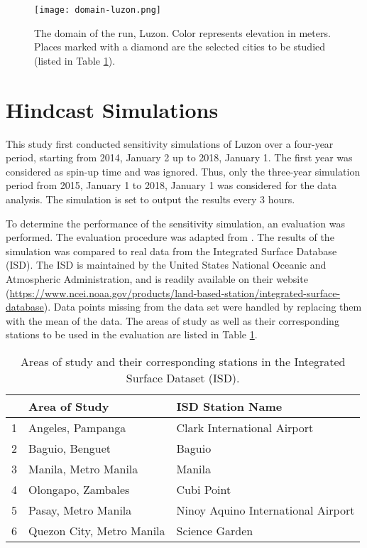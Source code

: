 		\begin{figure}
			\centering
			\texttt{[image: domain-luzon.png]}
			\caption{
				The domain of the run, Luzon.
				Color represents elevation in meters.
				Places marked with a diamond are the selected cities to be studied (listed in Table \ref{tab:isd-stations}).
			}
			\label{fig:domain-luzon}
		\end{figure}	
		
	
\section{Hindcast Simulations}
	This study first conducted sensitivity simulations of Luzon over a four-year period, starting from 2014, January 2 up to 2018, January 1.
	The first year was considered as spin-up time and was ignored.
	Thus, only the three-year simulation period from 2015, January 1 to 2018, January 1 was considered for the data analysis.
	The simulation is set to output the results every 3 hours.
	
	To determine the performance of the sensitivity simulation, an evaluation was performed. The evaluation procedure was adapted from \textcite{Bilang2022}.
	The results of the simulation was compared to real data from the Integrated Surface Database (ISD).
	The ISD is maintained by the United States National Oceanic and Atmospheric Administration, and is readily available on their website 
		(\url{https://www.ncei.noaa.gov/products/land-based-station/integrated-surface-database}).
	Data points missing from the data set were handled by replacing them with the mean of the data.
	The areas of study as well as their corresponding stations to be used in the evaluation are listed in Table \ref{tab:isd-stations}.

	\begin{table}	
		\caption{Areas of study and their corresponding stations in the Integrated Surface Dataset (ISD).}
		\label{tab:isd-stations}
		\centering
		\begin{tabular}{lll}
			\hline \hline
			& Area of Study             & ISD Station Name                       \\
			\hline
			1 & Angeles, Pampanga         & Clark International Airport        \\
			2 & Baguio, Benguet           & Baguio                             \\
			3 & Manila, Metro Manila      & Manila                             \\
			4 & Olongapo, Zambales        & Cubi Point                         \\
			5 & Pasay, Metro Manila      & Ninoy Aquino International Airport \\
			6 & Quezon City, Metro Manila & Science Garden \\                   
			\hline
		\end{tabular}	
	\end{table}

